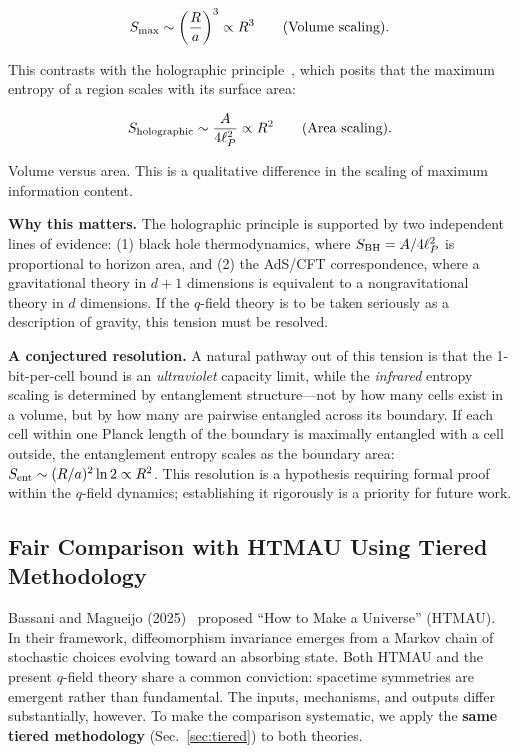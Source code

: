 \documentclass[aps,prd,twocolumn,showpacs,superscriptaddress,preprintnumbers]{revtex4-2}
\begin{document}
\begin{equation}
S_{\rm max} \sim \left(\frac{R}{a}\right)^3 \propto R^3 \qquad \text{(Volume scaling)}.
\label{eq:volume_scaling}
\end{equation}

This contrasts with the holographic principle~\cite{tHooft:1993,Susskind:1994vu}, which posits that the maximum entropy of a region scales with its surface area:

\begin{equation}
S_{\rm holographic} \sim \frac{A}{4\ell_P^2} \propto R^2 \qquad \text{(Area scaling)}.
\label{eq:area_scaling}
\end{equation}

Volume versus area. This is a qualitative difference in the scaling of maximum information content.

\textbf{Why this matters.}
The holographic principle is supported by two independent lines of evidence:
(1) black hole thermodynamics, where $S_{\rm BH}=A/4\ell_P^2$ is proportional to horizon area, and
(2) the AdS/CFT correspondence, where a gravitational theory in $d+1$ dimensions is equivalent to a nongravitational theory in $d$ dimensions.
If the $q$-field theory is to be taken seriously as a description of gravity, this tension must be resolved.

\textbf{A conjectured resolution.}
A natural pathway out of this tension is that the 1-bit-per-cell bound is an \emph{ultraviolet} capacity limit, while the \emph{infrared} entropy scaling is determined by entanglement structure---not by how many cells exist in a volume, but by how many are pairwise entangled across its boundary.
If each cell within one Planck length of the boundary is maximally entangled with a cell outside, the entanglement entropy scales as the boundary area: $S_{\rm ent}\sim(R/a)^2\ln 2\propto R^2$.
This resolution is a hypothesis requiring formal proof within the $q$-field dynamics; establishing it rigorously is a priority for future work.

\subsection{Fair Comparison with HTMAU Using Tiered Methodology}
\label{sec:htmau_comparison}

Bassani and Magueijo (2025)~\cite{Bassani:2025htma} proposed ``How to Make a Universe'' (HTMAU).
In their framework, diffeomorphism invariance emerges from a Markov chain of stochastic choices evolving toward an absorbing state.
Both HTMAU and the present $q$-field theory share a common conviction: spacetime symmetries are emergent rather than fundamental.
The inputs, mechanisms, and outputs differ substantially, however.
To make the comparison systematic, we apply the \textbf{same tiered methodology} (Sec.~\ref{sec:tiered}) to both theories.
\end{document}
